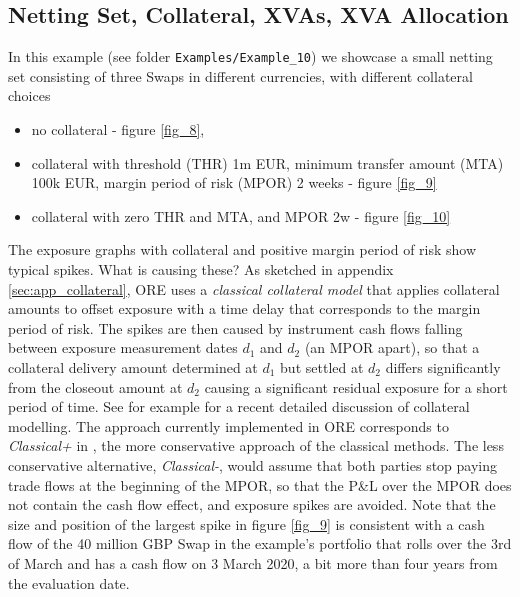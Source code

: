 \documentclass[12pt, a4paper]{article}
\begin{document}
\subsection{Netting Set, Collateral, XVAs, XVA Allocation}

In this example (see folder {\tt Examples/Example\_10}) we showcase a small netting set consisting of three Swaps in
different currencies, with different collateral choices
\begin{itemize}
\item no collateral - figure \ref{fig_8},
\item collateral with threshold (THR) 1m EUR, minimum transfer amount (MTA) 100k EUR, margin period of risk (MPOR) 2
  weeks - figure \ref{fig_9}
\item collateral with zero THR and MTA, and MPOR 2w - figure \ref{fig_10}
\end{itemize}
The exposure graphs with collateral and positive margin period of risk show typical spikes. What is causing these? As
sketched in appendix \ref{sec:app_collateral}, ORE uses a {\em classical collateral model} that applies collateral
amounts to offset exposure with a time delay that corresponds to the margin period of risk. The spikes are then caused
by instrument cash flows falling between exposure measurement dates $d_1$ and $d_2$ (an MPOR apart), so that a
collateral delivery amount determined at $d_1$ but settled at $d_2$ differs significantly from the closeout amount at
$d_2$ causing a significant residual exposure for a short period of time. See for example \cite{Andersen2016} for a
recent detailed discussion of collateral modelling. The approach currently implemented in ORE corresponds to {\em
  Classical+} in \cite{Andersen2016}, the more conservative approach of the classical methods. The less conservative
alternative, {\em Classical-}, would assume that both parties stop paying trade flows at the beginning of the MPOR, so
that the P\&L over the MPOR does not contain the cash flow effect, and exposure spikes are avoided. Note that the size
and position of the largest spike in figure \ref{fig_9} is consistent with a cash flow of the 40 million GBP Swap in the
example's portfolio that rolls over the 3rd of March and has a cash flow on 3 March 2020, a bit more than four years
from the evaluation date.
  
\end{document}
